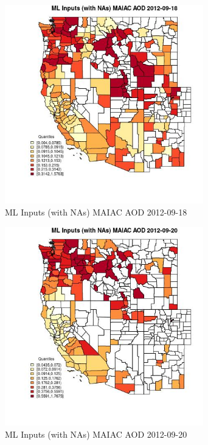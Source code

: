 \begin{figure} 
\centering  
\includegraphics[width=0.77\textwidth]{Code_Outputs/Report_ML_input_PM25_Step4_part_e_de_duplicated_aves_compiled_2019-05-14wNAs_CountyMAIAC_AODMean2012-09-18_2012-09-18.jpg} 
\caption{\label{fig:Report_ML_input_PM25_Step4_part_e_de_duplicated_aves_compiled_2019-05-14wNAsCountyMAIAC_AODMean2012-09-18_2012-09-18}ML Inputs (with NAs) MAIAC AOD 2012-09-18} 
\end{figure} 
 

\begin{figure} 
\centering  
\includegraphics[width=0.77\textwidth]{Code_Outputs/Report_ML_input_PM25_Step4_part_e_de_duplicated_aves_compiled_2019-05-14wNAs_CountyMAIAC_AODMean2012-09-20_2012-09-20.jpg} 
\caption{\label{fig:Report_ML_input_PM25_Step4_part_e_de_duplicated_aves_compiled_2019-05-14wNAsCountyMAIAC_AODMean2012-09-20_2012-09-20}ML Inputs (with NAs) MAIAC AOD 2012-09-20} 
\end{figure} 
 

